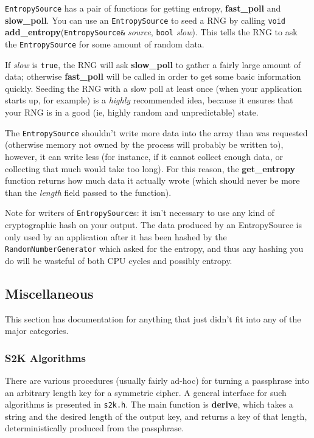 \documentclass{article}
\newcommand{\filename}[1]{\texttt{#1}}
\newcommand{\function}[1]{\textbf{#1}}
\newcommand{\type}[1]{\texttt{#1}}
\renewcommand{\arg}[1]{\textsl{#1}}
\begin{document}
\type{EntropySource} has a pair of functions for getting entropy,
\function{fast\_poll} and \function{slow\_poll}. You can use an
\type{EntropySource} to seed a RNG by calling \type{void}
\function{add\_entropy}(\type{EntropySource\&} \arg{source}, \type{bool}
\arg{slow}).  This tells the RNG to ask the \type{EntropySource} for some
amount of random data.

If \arg{slow} is \type{true}, the RNG will ask \function{slow\_poll} to gather
a fairly large amount of data; otherwise \function{fast\_poll} will be called
in order to get some basic information quickly. Seeding the RNG with a slow
poll at least once (when your application starts up, for example) is a
\emph{highly} recommended idea, because it ensures that your RNG is in a good
(ie, highly random and unpredictable) state.

The \type{EntropySource} shouldn't write more data into the array than was
requested (otherwise memory not owned by the process will probably be written
to), however, it can write less (for instance, if it cannot collect enough
data, or collecting that much would take too long). For this reason, the
\function{get\_entropy} function returns how much data it actually wrote (which
should never be more than the \arg{length} field passed to the function).

Note for writers of \type{EntropySource}s: it isn't necessary to use any kind
of cryptographic hash on your output. The data produced by an EntropySource is
only used by an application after it has been hashed by the
\type{RandomNumberGenerator} which asked for the entropy, and thus any hashing
you do will be wasteful of both CPU cycles and possibly entropy.

\subsection{Miscellaneous}

This section has documentation for anything that just didn't fit into any of
the major categories.

\subsubsection{S2K Algorithms}

There are various procedures (usually fairly ad-hoc) for turning a passphrase
into an arbitrary length key for a symmetric cipher. A general interface for
such algorithms is presented in \filename{s2k.h}. The main function is
\function{derive}, which takes a string and the desired length of the output
key, and returns a key of that length, deterministically produced from the
passphrase.
\end{document}
